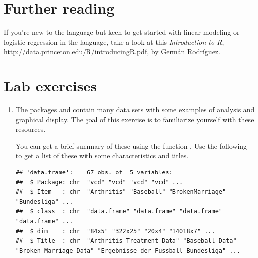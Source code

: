 \documentclass[11pt]{book}
\renewenvironment{knitrout}{\small\renewcommand{\baselinestretch}{.85}}{} %
\begin{document}
\section{Further reading}\label{sec:ch02-reading}

If you're new to the \R language but keen to get started with linear modeling or logistic regression in the language, take a look at this \emph{Introduction to R},
\url{http://data.princeton.edu/R/introducingR.pdf},
by Germ\'an Rodr\'iguez.

\section{Lab exercises}\label{sec:ch02-exercises}

\begin{enumerate}

\item The packages  and  contain many data sets with some
examples of analysis and graphical display.  The goal of this exercise is to
familiarize yourself with these resources.

You can get a brief summary of
these using the function .  Use the following to get a list of
these with some characteristics and titles.
\begin{knitrout}\footnotesize
{}\color{fgcolor}\begin{kframe}
\begin{alltt}
 \hlkwb{<-} \hlstd{(}\hlstd{=}\hlstd{(}\hlstd{,} \hlstd{))}
\end{alltt}
\begin{verbatim}
## 'data.frame':	67 obs. of  5 variables:
##  $ Package: chr  "vcd" "vcd" "vcd" "vcd" ...
##  $ Item   : chr  "Arthritis" "Baseball" "BrokenMarriage" "Bundesliga" ...
##  $ class  : chr  "data.frame" "data.frame" "data.frame" "data.frame" ...
##  $ dim    : chr  "84x5" "322x25" "20x4" "14018x7" ...
##  $ Title  : chr  "Arthritis Treatment Data" "Baseball Data" "Broken Marriage Data" "Ergebnisse der Fussball-Bundesliga" ...
\end{verbatim}
\end{kframe}
\end{knitrout}


\end{enumerate}
\end{document}
